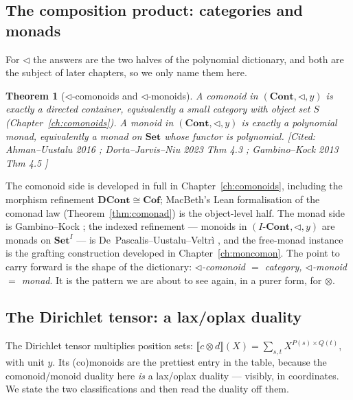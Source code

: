 \documentclass[11pt,a4paper]{book}
\newcommand{\Set}{\mathbf{Set}}
\newcommand{\Cof}{\mathbf{Cof}}
\newcommand{\Cont}{\mathbf{Cont}}
\newcommand{\DCont}{\mathbf{DCont}}
\newcommand{\Ext}[1]{\llbracket #1 \rrbracket}
\theoremstyle{plain}
\newtheorem{Theorem}{Theorem}[chapter]
\theoremstyle{definition}
\theoremstyle{remark}
\newcommand{\prov}[1]{\hfill\textsf{\footnotesize[#1]}}
\begin{document}
\subsection{The composition product: categories and monads}

For $\triangleleft$ the answers are the two halves of the polynomial dictionary,
and both are the subject of later chapters, so we only name them here.

\begin{Theorem}[$\triangleleft$-comonoids and $\triangleleft$-monoids]
\label{thm:comp-comonoid-monoid}
A comonoid in $(\Cont,\triangleleft,y)$ is exactly a \emph{directed container},
equivalently a \emph{small category} with object set $S$
(Chapter~\ref{ch:comonoids}). A monoid in $(\Cont,\triangleleft,y)$ is exactly a
\emph{polynomial monad}, equivalently a monad on $\Set$ whose functor is
polynomial.
\prov{Cited: Ahman--Uustalu 2016 \cite{AU16}; Dorta--Jarvis--Niu 2023
Thm 4.3 \cite{DJN}; Gambino--Kock 2013 Thm 4.5 \cite{GK}}
\end{Theorem}

\noindent The comonoid side is developed in full in
Chapter~\ref{ch:comonoids}, including the morphism refinement
$\DCont\cong\Cof$; MacBeth's Lean formalisation of the comonad law
(Theorem~\ref{thm:comonad}) is the object-level half. The monad side is
Gambino--Kock \cite{GK}; the indexed refinement --- monoids in
$(I\text{-}\Cont,\triangleleft,y)$ are monads on $\Set^I$ --- is
De~Pascalis--Uustalu--Veltr\`i \cite{DUV}, and the free-monad instance is the
grafting construction developed in Chapter~\ref{ch:moncomon}. The point to carry
forward is the shape of the dictionary: \emph{$\triangleleft$-comonoid $=$
category, $\triangleleft$-monoid $=$ monad}. It is the pattern we are about to see
again, in a purer form, for $\otimes$.

\subsection{The Dirichlet tensor: a lax/oplax duality}

The Dirichlet tensor multiplies position sets:
$\Ext{c\otimes d}(X)=\sum_{s,t}X^{P(s)\times Q(t)}$, with unit $y$. Its
(co)monoids are the prettiest entry in the table, because the comonoid/monoid
duality here \emph{is} a lax/oplax duality --- visibly, in coordinates. We state
the two classifications and then read the duality off them.
\end{document}
